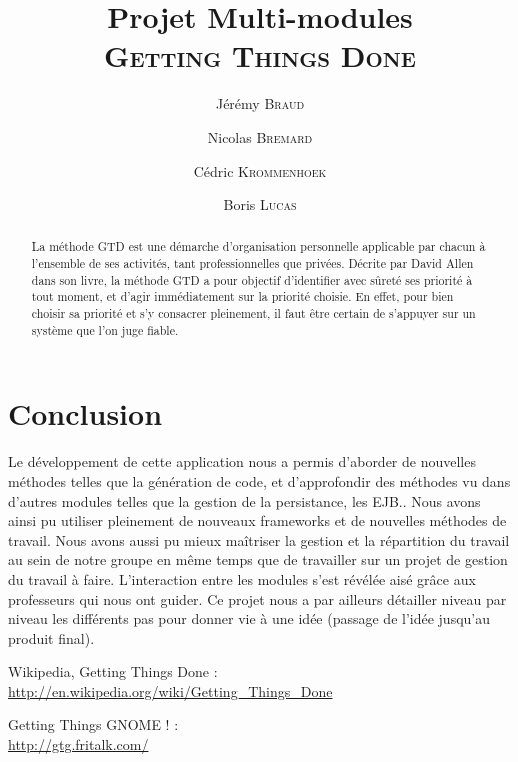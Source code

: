 \documentclass[a4paper, french, 10pt, twoside]{report}
\author{Jérémy \textsc{Braud} \and Nicolas \textsc{Bremard} \and Cédric \textsc{Krommenhoek} \and Boris \textsc{Lucas}}
\title{Projet Multi-modules\\
	\huge{\textsc{Getting Things Done}}}
\begin{document}
\dominitoc
{}
\maketitle

\begin{abstract}
La méthode GTD est une démarche d'organisation personnelle applicable par chacun à l'ensemble de ses activités, tant professionnelles que privées. Décrite par David Allen dans son livre, la méthode GTD a pour objectif d'identifier avec sûreté ses priorité à tout moment, et d'agir immédiatement sur la priorité choisie. En effet, pour bien choisir sa priorité et s'y consacrer pleinement, il faut être certain de s'appuyer sur un système que l'on juge fiable.
\end{abstract}

\setcounter{tocdepth}{2} 
\tableofcontents
\listoffigures













\chapter*{Conclusion}

Le développement de cette application nous a permis d'aborder de nouvelles méthodes telles que la génération de code, et d'approfondir des méthodes vu dans d'autres modules telles que la gestion de la persistance, les EJB.. Nous avons ainsi pu utiliser pleinement de nouveaux frameworks et de nouvelles méthodes de travail.
Nous avons aussi pu mieux maîtriser la gestion et la répartition du travail au sein de notre groupe en même temps que de travailler sur un projet de gestion du travail à faire.
L'interaction entre les modules s'est révélée aisé grâce aux professeurs qui nous ont guider.
Ce projet nous a par ailleurs détailler niveau par niveau les différents pas pour donner vie à une idée (passage de l'idée jusqu'au produit final).


\begin{thebibliography}{99}

Wikipedia, Getting Things Done : \\
\url{http://en.wikipedia.org/wiki/Getting_Things_Done}

Getting Things GNOME ! : \\
\url{http://gtg.fritalk.com/}

\end{thebibliography}
\end{document}
